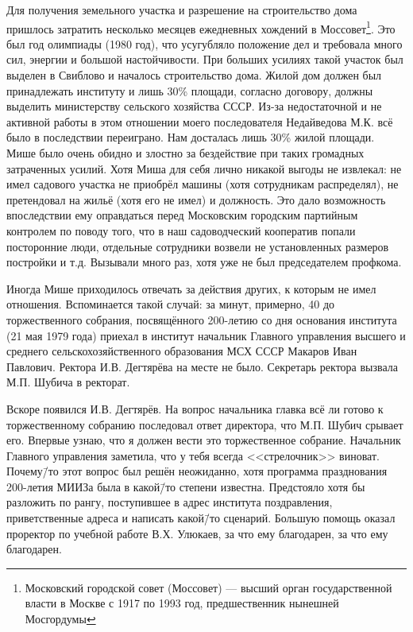 Для получения земельного участка и разрешение на строительство дома пришлось затратить несколько месяцев ежедневных хождений в Моссовет\footnote{Московский городской совет (Моссовет) — высший орган государственной власти в Москве с 1917 по 1993 год, предшественник нынешней Мосгордумы}. Это был год олимпиады (1980 год), что усугубляло положение дел и требовала много сил, энергии и большой настойчивости. При больших усилиях такой участок был выделен в Свиблово и началось строительство дома. Жилой дом должен был принадлежать институту и лишь 30\% площади, согласно договору, должны выделить министерству сельского хозяйства СССР. Из-за недостаточной и не активной работы в этом отношении моего последователя Недайведова М.К. всё было в последствии переиграно. Нам досталась лишь 30\% жилой площади. Мише было очень обидно и злостно за бездействие при таких громадных затраченных усилий. Хотя Миша для себя лично никакой выгоды не извлекал: не имел садового участка не приобрёл машины (хотя сотрудникам распределял), не претендовал на жильё (хотя его не имел) и должность. Это дало возможность впоследствии ему оправдаться перед Московским городским партийным контролем по поводу того, что в наш садоводческий кооператив попали посторонние люди, отдельные сотрудники возвели не установленных размеров постройки и т.д. Вызывали много раз, хотя уже не был председателем профкома.

Иногда Мише приходилось отвечать за действия других, к которым не имел отношения. Вспоминается такой случай: за минут, примерно, 40 до торжественного собрания, посвящённого 200-летию со дня основания института (21 мая 1979 года) приехал в институт начальник Главного управления высшего и среднего сельскохозяйственного образования МСХ СССР Макаров Иван Павлович. Ректора И.В. Дегтярёва на месте не было. Секретарь ректора вызвала М.П. Шубича в ректорат.

Вскоре появился И.В. Дегтярёв. На вопрос начальника главка всё ли готово к торжественному собранию последовал ответ директора, что М.П. Шубич срывает его. Впервые узнаю, что я должен вести это торжественное собрание. Начальник Главного управления заметила, что у тебя всегда <<стрелочник>> виноват. Почему\=/то этот вопрос был решён неожиданно, хотя программа празднования 200-летия МИИЗа была в какой\=/то степени известна. Предстояло хотя бы разложить по рангу, поступившее в адрес института поздравления, приветственные адреса и написать какой\=/то сценарий. Большую помощь оказал проректор по учебной работе В.Х. Улюкаев, за что ему благодарен, за что ему благодарен.

